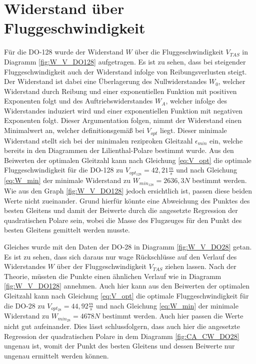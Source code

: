 \section{Widerstand über Fluggeschwindigkeit}
Für die DO-128 wurde der Widerstand $W$ über die Fluggeschwindigkeit $V_{TAS}$ in Diagramm \ref{fig:W_V_DO128} aufgetragen. Es ist zu sehen, dass bei steigender Fluggeschwindigkeit auch der Widerstand infolge von Reibungsverlusten steigt. Der Widerstand ist dabei eine Überlagerung des Nullwiderstandes $W_0$, welcher Widerstand durch Reibung und einer exponentiellen Funktion mit positiven Exponenten folgt und des Auftriebswiderstandes $W_A$, welcher infolge des Widerstandes induziert wird und einer exponentiellen Funktion mit negativen Exponenten folgt. Dieser Argumentation folgen, nimmt der Widerstand einen Minimalwert an, welcher definitionsgemäß bei $V_{opt}$ liegt. Dieser minimale Widerstand stellt sich bei der minimalen reziproken Gleitzahl $\epsilon_{min}$ ein, welche bereits in den Diagrammen der Lilienthal-Polare bestimmt wurde. Aus den Beiwerten der optimalen Gleitzahl kann nach Gleichung \ref{eq:V_opt} die optimale Fluggeschwindigkeit für die DO-128 zu $V_{opt_{128}} = 42,21 \frac{m}{s}$ und nach Gleichung \ref{eq:W_min} der minimale Widerstand zu $W_{min_{128}} = 2636,3 N$ bestimmt werden. Wie aus den Graph \ref{fig:W_V_DO128} jedoch ersichtlich ist, passen diese beiden Werte nicht zueinander. Grund hierfür könnte eine Abweichung des Punktes des besten Gleitens und damit der Beiwerte durch die angesetzte Regression der quadratischen Polare sein, wobei die Masse des Flugzeuges für den Punkt des besten Gleitens gemittelt werden musste. 


Gleiches wurde mit den Daten der DO-28 in Diagramm \ref{fig:W_V_DO28} getan. Es ist zu sehen, dass sich daraus nur wage Rückschlüsse auf den Verlauf des Widerstandes $W$ über der Fluggeschwindigkeit $V_{TAS}$ ziehen lassen. Nach der Theorie, müssten die Punkte einen ähnlichen Verlauf wie in Diagramm \ref{fig:W_V_DO128} annehmen. Auch hier kann aus den Beiwerten der optimalen Gleitzahl kann nach Gleichung \ref{eq:V_opt} die optimale Fluggeschwindigkeit für die DO-28 zu $V_{opt_{28}} = 44,92 \frac{m}{s}$ und nach Gleichung \ref{eq:W_min} der minimale Widerstand zu $W_{min_{28}} = 4678 N$ bestimmt werden. Auch hier passen die Werte nicht gut aufeinander. Dies lässt schlussfolgern, dass auch hier die angesetzte Regression der quadratischen Polare in dem Diagramm \ref{fig:CA_CW_DO28} ungenau ist, womit der Punkt des besten Gleitens und dessen Beiwerte nur ungenau ermittelt werden können.

